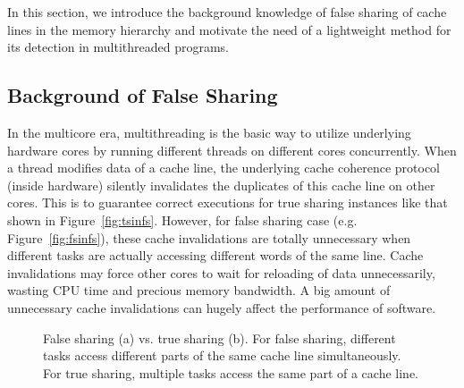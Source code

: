 \label{sec:overview}

In this section, we introduce the background knowledge of false sharing of cache lines in the memory hierarchy and motivate the need of a lightweight method for its detection in multithreaded programs.
\subsection{Background of False Sharing}
\label{sec:background}

In the multicore era, multithreading is the basic way to utilize underlying hardware cores by running different threads on different cores concurrently. When a thread modifies data of a cache line, the underlying cache coherence protocol (inside hardware) silently invalidates the duplicates of this cache line on other cores. This is to guarantee correct executions for true sharing instances like that shown in Figure~\ref{fig:tsinfs}. However, for false sharing case (e.g. Figure~\ref{fig:fsinfs}), these cache invalidations are totally unnecessary when different tasks are actually accessing different words of the same line. Cache invalidations may force other cores to wait for reloading of data unnecessarily, wasting CPU time and precious memory bandwidth. A big amount of unnecessary cache invalidations can hugely affect the performance of software. %

\begin{figure}[htbp]
\centering
{}%
\hspace{30pt}
%
\caption{False sharing (a) vs. true sharing (b). For false sharing, different tasks access different parts of the same cache line simultaneously. For true sharing, multiple tasks access the same part of a cache line.\label{fig:falsesharing}}
\end{figure}

